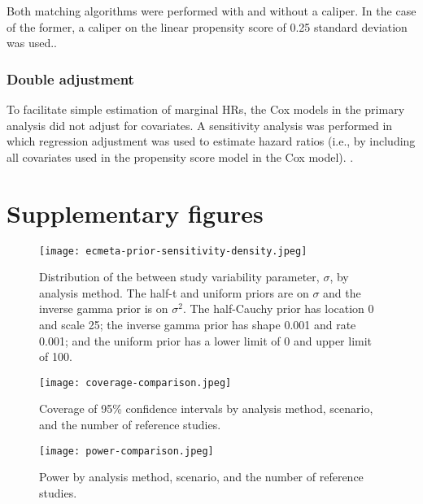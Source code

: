 \documentclass[11pt,final,fleqn]{article}\usepackage[]{graphicx}\usepackage[]{color}
\begin{document}
Both matching algorithms  were performed with and without a caliper. In the case of the former, a caliper on the linear propensity score of 0.25 standard deviation was used.\cite{rosenbaum1985constructing}.

\subsubsection{Double adjustment}
To facilitate simple estimation of marginal HRs, the Cox models in the primary analysis did not adjust for covariates. A sensitivity analysis was performed in which regression adjustment was used to estimate hazard ratios (i.e., by including all covariates used in the propensity score model in the Cox model). \cite{rubin1973use, nguyen2017double}.

\section{Supplementary figures} \label{appendix:figs}

\begin{figure}[h]
\centering
\texttt{[image: ecmeta-prior-sensitivity-density.jpeg]} 
\caption{Distribution of the between study variability parameter, $\sigma$, by analysis method. The half-t and uniform priors are on $\sigma$ and the inverse gamma prior is on $\sigma^2$. The half-Cauchy prior has location  0 and scale 25; the inverse gamma prior has shape 0.001 and rate 0.001; and the uniform prior has a lower limit of 0 and upper limit of 100. }
\label{fig:prior-sensitivity}
\end{figure}

\begin{figure}[h]
\centering
\texttt{[image: coverage-comparison.jpeg]} 
\caption{Coverage of 95\% confidence intervals by analysis method, scenario, and the number of reference studies.}
\label{fig:coverage-comparison}
\end{figure}

\begin{figure}[h]
\centering
\texttt{[image: power-comparison.jpeg]} 
\caption{Power by analysis method, scenario, and the number of reference studies.}
\label{fig:power-comparison}
\end{figure}
\end{document}
